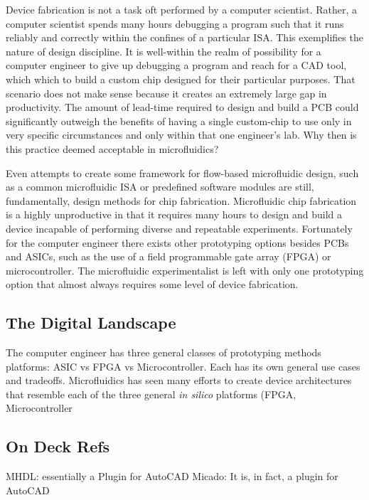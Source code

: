 \documentclass[11pt,journal,compsoc, onecolumn]{IEEEtran}
\begin{document}
Device fabrication is not a task oft performed by a computer scientist. Rather,
a computer scientist spends many hours debugging a program such that it runs
reliably and correctly within the confines of a particular ISA. This
exemplifies the nature of design discipline. It is well-within the realm of
possibility for a computer engineer to give up debugging a program and reach
for a CAD tool, which which to build a custom chip designed for their
particular purposes. That scenario does not make sense because it creates an
extremely large gap in productivity. The amount of lead-time required to design
and build a PCB could significantly outweigh the benefits of having a single
custom-chip to use only in very specific circumstances and only within that one
engineer's lab. Why then is this practice deemed acceptable in microfluidics?

Even attempts to create some framework for flow-based microfluidic design, such
as a common microfluidic ISA\cite{amin2009} or predefined software modules
\cite{soe2013} are still, fundamentally, design methods for chip fabrication.
Microfluidic chip fabrication is a highly unproductive in that it requires many
hours to design and build a device incapable of performing diverse and repeatable
experiments. Fortunately for the computer engineer there exists other prototyping
options besides PCBs and ASICs, such as the use of a field programmable gate
array (FPGA) or microcontroller. The microfluidic experimentalist is left with
only one prototyping option that almost always requires some level of device
fabrication.

\subsection{The Digital Landscape}

The computer engineer has three general classes of prototyping methods
platforms: ASIC vs FPGA vs Microcontroller. Each has its own general use cases
and tradeoffs. Microfluidics has seen many efforts to create device
architectures that resemble each of the three general \emph{in silico}
platforms (FPGA\cite{fidalgo2011}, Microcontroller

\subsection{On Deck Refs}
MHDL: essentially a Plugin for AutoCAD \cite{mcdaniel2013}
Micado: It is, in fact, a plugin for AutoCAD \cite{amin2009}
\end{document}
